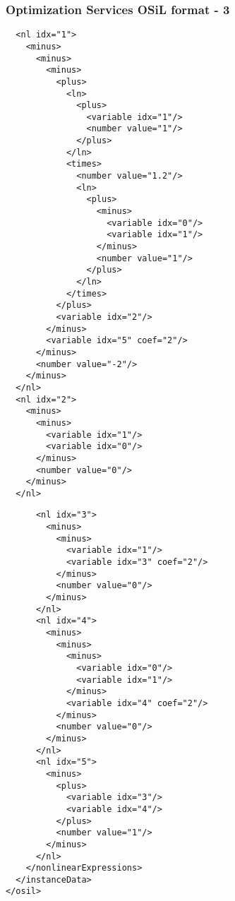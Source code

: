 \documentclass[compressed,dvips,letter]{beamer}
\begin{document}
\begin{frame}[fragile]\frametitle{Optimization Services OSiL format - 3}
\begin{minipage}{0.54\textwidth}
{\fontsize{6pt}{0} \selectfont
\begin{verbatim}
  <nl idx="1">
    <minus>
      <minus>
        <minus>
          <plus>
            <ln>
              <plus>
                <variable idx="1"/>
                <number value="1"/>
              </plus>
            </ln>
            <times>
              <number value="1.2"/>
              <ln>
                <plus>
                  <minus>
                    <variable idx="0"/>
                    <variable idx="1"/>
                  </minus>
                  <number value="1"/>
                </plus>
              </ln>
            </times>
          </plus>
          <variable idx="2"/>
        </minus>
        <variable idx="5" coef="2"/>
      </minus>
      <number value="-2"/>
    </minus>
  </nl>
  <nl idx="2">
    <minus>
      <minus>
        <variable idx="1"/>
        <variable idx="0"/>
      </minus>
      <number value="0"/>
    </minus>
  </nl>
\end{verbatim}
}
\end{minipage}
\begin{minipage}{0.42\textwidth}
{\fontsize{6pt}{0} \selectfont
\begin{verbatim}
      <nl idx="3">
        <minus>
          <minus>
            <variable idx="1"/>
            <variable idx="3" coef="2"/>
          </minus>
          <number value="0"/>
        </minus>
      </nl>
      <nl idx="4">
        <minus>
          <minus>
            <minus>
              <variable idx="0"/>
              <variable idx="1"/>
            </minus>
            <variable idx="4" coef="2"/>
          </minus>
          <number value="0"/>
        </minus>
      </nl>
      <nl idx="5">
        <minus>
          <plus>
            <variable idx="3"/>
            <variable idx="4"/>
          </plus>
          <number value="1"/>
        </minus>
      </nl>
    </nonlinearExpressions>
  </instanceData>
</osil>
\end{verbatim}
}
\end{minipage}
\end{frame}
%
%
\end{document}
